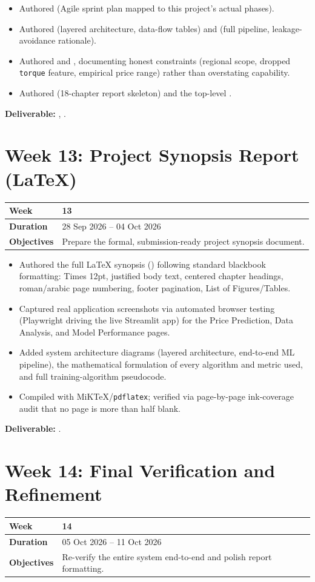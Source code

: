 \documentclass[12pt,a4paper]{report}
\newcommand{\weektable}[3]{%
\begin{longtable}{|p{3.6cm}|p{10.5cm}|}
\hline
\textbf{Week} & \textbf{#1} \\
\hline
\textbf{Duration} & #2 \\
\hline
\textbf{Objectives} & #3 \\
\hline
\end{longtable}
}
\begin{document}
\begin{itemize}[nosep]
    \item Authored  (Agile sprint plan mapped to this project's actual phases).
    \item Authored  (layered architecture, data-flow tables) and  (full pipeline, leakage-avoidance rationale).
    \item Authored  and , documenting honest constraints (regional scope, dropped \texttt{torque} feature, empirical price range) rather than overstating capability.
    \item Authored  (18-chapter report skeleton) and the top-level .
\end{itemize}
\textbf{Deliverable:} , .

\chapter{Week 13: Project Synopsis Report (LaTeX)}
\weektable{13}{28 Sep 2026 -- 04 Oct 2026}{Prepare the formal, submission-ready project synopsis document.}

\begin{itemize}[nosep]
    \item Authored the full LaTeX synopsis () following standard blackbook formatting: Times 12pt, justified body text, centered chapter headings, roman/arabic page numbering, footer pagination, List of Figures/Tables.
    \item Captured real application screenshots via automated browser testing (Playwright driving the live Streamlit app) for the Price Prediction, Data Analysis, and Model Performance pages.
    \item Added system architecture diagrams (layered architecture, end-to-end ML pipeline), the mathematical formulation of every algorithm and metric used, and full training-algorithm pseudocode.
    \item Compiled with MiKTeX/\texttt{pdflatex}; verified via page-by-page ink-coverage audit that no page is more than half blank.
\end{itemize}
\textbf{Deliverable:} .

\chapter{Week 14: Final Verification and Refinement}
\weektable{14}{05 Oct 2026 -- 11 Oct 2026}{Re-verify the entire system end-to-end and polish report formatting.}
\end{document}
